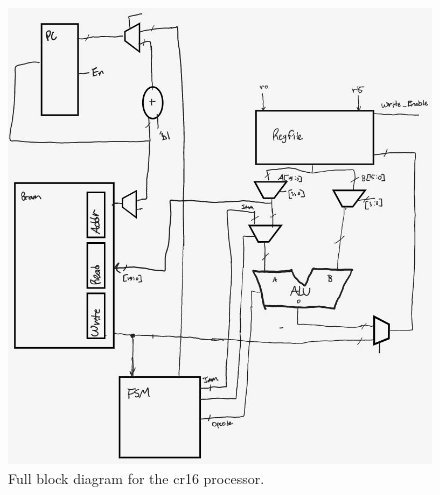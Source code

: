 \documentclass[conference]{IEEEtran}
\begin{document}
\begin{figure}
    \centering
    \includegraphics[scale=0.55]{resources/figures/full_bd.jpg}
    \caption{Full block diagram for the cr16 processor.}
    \label{fig:full_bd}
\end{figure}
\end{document}
